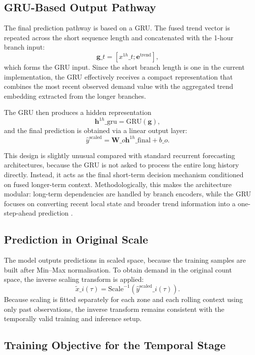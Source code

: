 \documentclass[12pt,a4paper]{report}
\begin{document}
\subsection{GRU-Based Output Pathway}

The final prediction pathway is based on a GRU. The fused trend vector is repeated across the short sequence length and concatenated with the 1-hour branch input:
\[
\mathbf{g}\_t = [x^{1h}\_t ; \mathbf{e}^{\text{trend}}],
\]
which forms the GRU input. Since the short branch length is one in the current implementation, the GRU effectively receives a compact representation that combines the most recent observed demand value with the aggregated trend embedding extracted from the longer branches.

The GRU then produces a hidden representation
\[
\mathbf{h}^{1h}\_{\text{gru}} = \text{GRU}(\mathbf{g}),
\]
and the final prediction is obtained via a linear output layer:
\[
\hat{y}^{\text{scaled}} = \mathbf{W}\_o \mathbf{h}^{1h}\_{\text{final}} + b\_o.
\]

This design is slightly unusual compared with standard recurrent forecasting architectures, because the GRU is not asked to process the entire long history directly. Instead, it acts as the final short-term decision mechanism conditioned on fused longer-term context. Methodologically, this makes the architecture modular: long-term dependencies are handled by branch encoders, while the GRU focuses on converting recent local state and broader trend information into a one-step-ahead prediction \cite{cho2014gru,kim2025dltimeseries}.

\subsection{Prediction in Original Scale}

The model outputs predictions in scaled space, because the training samples are built after Min--Max normalisation. To obtain demand in the original count space, the inverse scaling transform is applied:
\[
\tilde{x}\_i(\tau)
=
\text{Scale}^{-1}(\hat{y}^{\text{scaled}}\_i(\tau)).
\]
Because scaling is fitted separately for each zone and each rolling context using only past observations, the inverse transform remains consistent with the temporally valid training and inference setup.

\subsection{Training Objective for the Temporal Stage}
\end{document}
